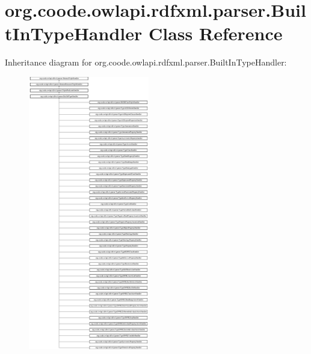 \hypertarget{classorg_1_1coode_1_1owlapi_1_1rdfxml_1_1parser_1_1_built_in_type_handler}{\section{org.\-coode.\-owlapi.\-rdfxml.\-parser.\-Built\-In\-Type\-Handler Class Reference}
\label{classorg_1_1coode_1_1owlapi_1_1rdfxml_1_1parser_1_1_built_in_type_handler}
}
Inheritance diagram for org.\-coode.\-owlapi.\-rdfxml.\-parser.\-Built\-In\-Type\-Handler\-:\begin{figure}[H]
\begin{center}
\leavevmode
\includegraphics[height=12.000000cm]{classorg_1_1coode_1_1owlapi_1_1rdfxml_1_1parser_1_1_built_in_type_handler}
\end{center}
\end{figure}
